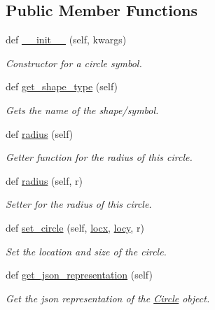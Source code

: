 \subsection*{Public Member Functions}
\begin{DoxyCompactItemize}
\item 
def \hyperlink{classbridges_1_1circle_1_1_circle_a04dfb68bb632534cf715e2ce927cc76a}{\+\_\+\+\_\+init\+\_\+\+\_\+} (self, kwargs)
\begin{DoxyCompactList}\small\item\em Constructor for a circle symbol. \end{DoxyCompactList}\item 
def \hyperlink{classbridges_1_1circle_1_1_circle_ae84bcb74b248cc701b4e12efe25f6896}{get\+\_\+shape\+\_\+type} (self)
\begin{DoxyCompactList}\small\item\em Gets the name of the shape/symbol. \end{DoxyCompactList}\item 
def \hyperlink{classbridges_1_1circle_1_1_circle_abc82c7f3e8ac6112167b396839863319}{radius} (self)
\begin{DoxyCompactList}\small\item\em Getter function for the radius of this circle. \end{DoxyCompactList}\item 
def \hyperlink{classbridges_1_1circle_1_1_circle_ae7c2dc54c90d954626f99d7561009587}{radius} (self, r)
\begin{DoxyCompactList}\small\item\em Setter for the radius of this circle. \end{DoxyCompactList}\item 
def \hyperlink{classbridges_1_1circle_1_1_circle_a42b7ccd17017ca328371ce27e1bdbffe}{set\+\_\+circle} (self, \hyperlink{classbridges_1_1circle_1_1_circle_a23b8dd93569e14abc63c41aa78e4c1a6}{locx}, \hyperlink{classbridges_1_1circle_1_1_circle_a2f2e3b85639957633057eb0d0bbdd190}{locy}, r)
\begin{DoxyCompactList}\small\item\em Set the location and size of the circle. \end{DoxyCompactList}\item 
def \hyperlink{classbridges_1_1circle_1_1_circle_a7a1be40bcd6028dab0a5bcab6e69c355}{get\+\_\+json\+\_\+representation} (self)
\begin{DoxyCompactList}\small\item\em Get the json representation of the \hyperlink{classbridges_1_1circle_1_1_circle}{Circle} object. \end{DoxyCompactList}\end{DoxyCompactItemize}
